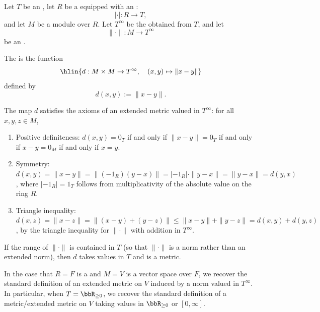 \begin{definition} \label{definition:extended_metric_induced_by_an_extended_norm_on_a_module_over_a_commutative_ring_with_absolute_value}
    Let $T$ be an , let $R$ be a  equipped with an :
    $$|\cdot| : R \to T,$$
    and let $M$ be a module over $R$. Let $T^\infty$ be the  obtained from $T$, and let
    $$\|\cdot\| : M \to T^\infty$$
    be an .

    The  is the function
    $$\hlin{d : M \times M \to T^\infty, \quad (x,y) \mapsto \|x - y\|}$$
    defined by
    $$d(x,y) := \|x - y\|.$$

    The map $d$ satisfies the axioms of an extended metric valued in $T^\infty$: for all $x,y,z \in M$,
    \begin{enumerate}
        \item Positive definiteness: $d(x,y) = 0_T$ if and only if $\|x - y\| = 0_T$ if and only if $x - y = 0_M$ if and only if $x = y$.
        \item Symmetry: $d(x,y) = \|x - y\| = \|(-1_R)(y - x)\| = |-1_R| \cdot \|y - x\| = \|y - x\| = d(y,x)$, where $|-1_R| = 1_T$ follows from multiplicativity of the absolute value on the ring $R$.
        \item Triangle inequality: $d(x,z) = \|x - z\| = \|(x - y) + (y - z)\| \leq \|x - y\| + \|y - z\| = d(x,y) + d(y,z)$, by the triangle inequality for $\|\cdot\|$ with addition in $T^\infty$.
    \end{enumerate}

    If the range of $\|\cdot\|$ is contained in $T$ (so that $\|\cdot\|$ is a norm rather than an extended norm), then $d$ takes values in $T$ and is a metric.

    In the case that $R = F$ is a  and $M = V$ is a vector space over $F$, we recover the standard definition of an extended metric on $V$ induced by a norm valued in $T^\infty$. In particular, when $T = \bbR_{\geq 0}$, we recover the standard definition of a metric/extended metric on $V$ taking values in $\bbR_{\geq 0}$ or $[0,\infty]$.
\end{definition}
